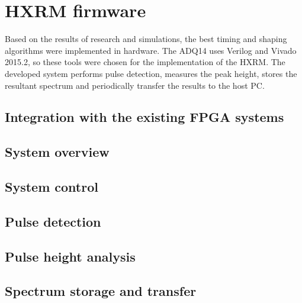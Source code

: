 \section{HXRM firmware}
Based on the results of research and simulations, the best timing
and shaping algorithms were implemented in hardware.
The ADQ14 uses Verilog and Vivado 2015.2, so these tools
were chosen for the implementation of the HXRM.
The developed system performs pulse detection,
measures the peak height, stores the resultant spectrum
and periodically transfer the results to the host PC.
\subsection{Integration with the existing FPGA systems}
\subsection{System overview}
\subsection{System control}
\subsection{Pulse detection}
\subsection{Pulse height analysis}
\subsection{Spectrum storage and transfer}
